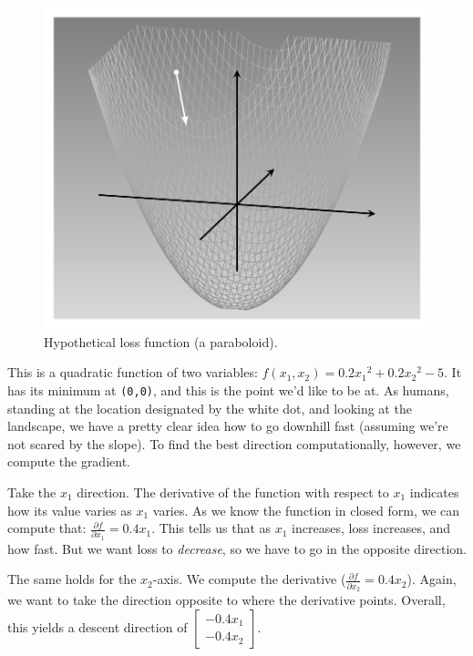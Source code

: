 \documentclass[
  letterpaper,
]{krantz}
\begin{document}
\begin{figure}[H]

{\centering \includegraphics{images/autograd-paraboloid.png}

}

\caption{\label{fig-autograd-paraboloid}Hypothetical loss function (a
paraboloid).}

\end{figure}

This is a quadratic function of two variables:
\(f(x_1, x_2) = 0.2 {x_1}^2 + 0.2 {x_2}^2 - 5\). It has its minimum at
\texttt{(0,0)}, and this is the point we'd like to be at. As humans,
standing at the location designated by the white dot, and looking at the
landscape, we have a pretty clear idea how to go downhill fast (assuming
we're not scared by the slope). To find the best direction
computationally, however, we compute the gradient.

Take the \(x_1\) direction. The derivative of the function with respect
to \(x_1\) indicates how its value varies as \(x_1\) varies. As we know
the function in closed form, we can compute that:
\(\frac{\partial f}{\partial x_1} = 0.4 x_1\). This tells us that as
\(x_1\) increases, loss increases, and how fast. But we want loss to
\emph{decrease}, so we have to go in the opposite direction.

The same holds for the \(x_2\)-axis. We compute the derivative
(\(\frac{\partial f}{\partial x_2} = 0.4 x_2\)). Again, we want to take
the direction opposite to where the derivative points. Overall, this
yields a descent direction of
\(\begin{bmatrix}-0.4x_1\\-0.4x_2 \end{bmatrix}\).
\end{document}
